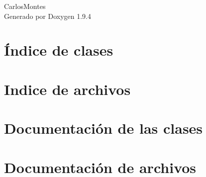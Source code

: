 \documentclass[twoside]{book}
\newcommand{\+}{\discretionary{\mbox{\scriptsize$\hookleftarrow$}}{}{}}
\newcommand{\clearemptydoublepage}{%
    \newpage{\pagestyle{empty}\cleardoublepage}%
  }
\begin{document}
  \raggedbottom
    \hypersetup{pageanchor=false,
                bookmarksnumbered=true,
                pdfencoding=unicode
               }
  \begin{titlepage}
  \vspace*{7cm}
  \begin{center}%
  {\Large Carlos\+Montes}\\
  \vspace*{1cm}
  {\large Generado por Doxygen 1.9.4}\\
  \end{center}
  \end{titlepage}
  \clearemptydoublepage
  \tableofcontents
  \clearemptydoublepage
  \hypersetup{pageanchor=true}
\chapter{Índice de clases}

\chapter{Indice de archivos}

\chapter{Documentación de las clases}










\chapter{Documentación de archivos}












  \backmatter
  \newpage
  \clearemptydoublepage
  \printindex
\end{document}
